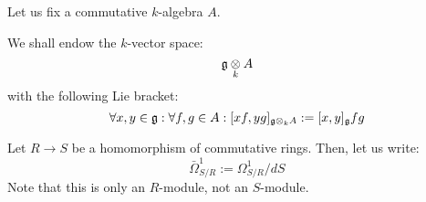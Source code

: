         \begin{convention}
            Let us fix a commutative $k$-algebra $A$.

            We shall endow the $k$-vector space:
                $$\g \tensor_k A$$
            with the following Lie bracket:
                $$\forall x, y \in \g: \forall f, g \in A: [x f, y g]_{\g \tensor_k A} := [x, y]_{\g} fg$$
        \end{convention}

        \begin{convention}
            Let $R \to S$ be a homomorphism of commutative rings. Then, let us write:
                $$\bar{\Omega}^1_{S/R} := \Omega^1_{S/R}/dS$$
            Note that this is only an $R$-module, not an $S$-module.
        \end{convention}
        
